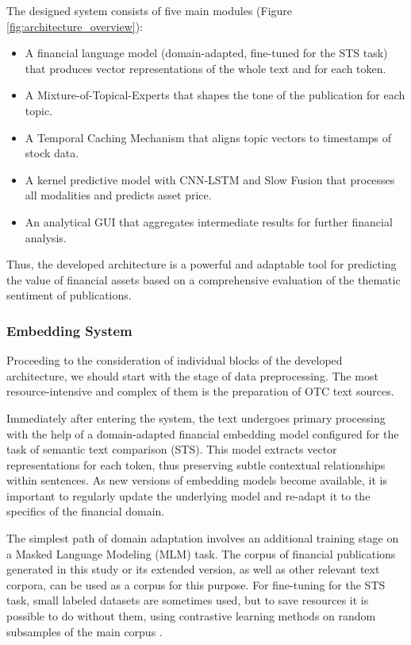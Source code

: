 The designed system consists of five main modules (Figure \ref{fig:architecture_overview}):

\begin{itemize}
    \item A financial language model (domain-adapted, fine-tuned for the STS task) that produces vector representations
    of the whole text and for each token.
    \item A Mixture-of-Topical-Experts that shapes the tone of the publication for each topic.
    \item A Temporal Caching Mechanism that aligns topic vectors to timestamps of stock data.
    \item A kernel predictive model with CNN-LSTM and Slow Fusion that processes all modalities and predicts asset price.
    \item An analytical GUI that aggregates intermediate results for further financial analysis.
\end{itemize}

Thus, the developed architecture is a powerful and adaptable tool for predicting the value of financial assets
based on a comprehensive evaluation of the thematic sentiment of publications.

\subsubsection{Embedding System}
Proceeding to the consideration of individual blocks of the developed architecture, we should start with the stage
of data preprocessing. The most resource-intensive and complex of them is the preparation of OTC text sources.

Immediately after entering the system, the text undergoes primary processing with the help of a domain-adapted
financial embedding model configured for the task of semantic text comparison (STS). This model extracts vector
representations for each token, thus preserving subtle contextual relationships within sentences. As new versions
of embedding models become available, it is important to regularly update the underlying model and re-adapt it
to the specifics of the financial domain.

The simplest path of domain adaptation involves an additional training stage on a Masked Language Modeling (MLM)
task. The corpus of financial publications generated in this study or its extended version, as well as other relevant
text corpora, can be used as a corpus for this purpose. For fine-tuning for the STS task, small labeled datasets
are sometimes used, but to save resources it is possible to do without them, using contrastive learning methods
on random subsamples of the main corpus \parencite{gao2021simcse}.

